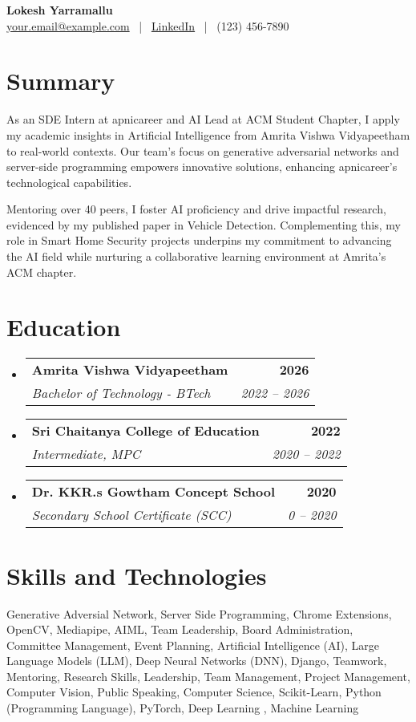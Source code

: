 \documentclass[letterpaper,11pt]{article}
\makeatletter
\newcommand{\resumeSubheading}[4]{\item
        \begin{tabular*}{\textwidth}{l@{\extracolsep{\fill}}r}
        \textbf{#1} & \textbf{#2} \\
        \textit{#3} & \textit{#4} \\
        \end{tabular*}\vspace{-5pt}}
\newcommand{\resumeSubHeadingListStart}{\begin{itemize}[leftmargin=0.15in, label={}]}
\newcommand{\resumeSubHeadingListEnd}{\end{itemize}}
\makeatother
\begin{document}
    \begin{center}
        {\huge \textbf{Lokesh Yarramallu}} \\
        \href{mailto:your.email@example.com}{your.email@example.com} ~|~ \href{https://www.linkedin.com/in/lokeshyarramallu}{LinkedIn} ~|~ (123) 456-7890
    \end{center}
    
        \section{Summary}
        As an SDE Intern at apnicareer and AI Lead at ACM Student Chapter, I apply my academic insights in Artificial Intelligence from Amrita Vishwa Vidyapeetham to real-world contexts. Our team's focus on generative adversarial networks and server-side programming empowers innovative solutions, enhancing apnicareer's technological capabilities.

Mentoring over 40 peers, I foster AI proficiency and drive impactful research, evidenced by my published paper in Vehicle Detection. Complementing this, my role in Smart Home Security projects underpins my commitment to advancing the AI field while nurturing a collaborative learning environment at Amrita's ACM chapter.
        \section{Education}
\resumeSubHeadingListStart

            \resumeSubheading
                {Amrita Vishwa Vidyapeetham}{2026}
                {\textnormal{Bachelor of Technology {-} BTech}}{2022 -- 2026}
            
            \resumeSubheading
                {Sri Chaitanya College of Education}{2022}
                {\textnormal{Intermediate, MPC}}{2020 -- 2022}
            
            \resumeSubheading
                {Dr. KKR.s Gowtham Concept School}{2020}
                {\textnormal{Secondary School Certificate (SCC)}}{0 -- 2020}
            \resumeSubHeadingListEnd
\section{{Skills and Technologies}}
Generative Adversial Network, Server Side Programming, Chrome Extensions, OpenCV, Mediapipe, AIML, Team Leadership, Board Administration, Committee Management, Event Planning, Artificial Intelligence (AI), Large Language Models (LLM), Deep Neural Networks (DNN), Django, Teamwork, Mentoring, Research Skills, Leadership, Team Management, Project Management, Computer Vision, Public Speaking, Computer Science, Scikit-Learn, Python (Programming Language), PyTorch, Deep Learning , Machine Learning
\end{document}
